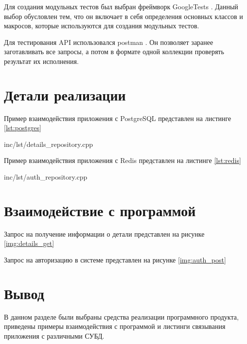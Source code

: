 Для создания модульных тестов был выбран фреймворк GoogleTests \cite{gtest}. Данный выбор обусловлен тем, что он включает в себя определения основных классов и макросов, которые используются для создания модульных тестов.

Для тестирования API использовался postman \cite{postman}. Он позволяет заранее заготавливать все запросы, а потом в формате одной коллекции проверять результат их исполнения.

\section{Детали реализации}

Пример взаимодействия приложения с PostgreSQL представлен на листинге \ref{lst:postgres}

\begin{lstinputlisting}[label=lst:postgres,caption=Взаимодействие приложения с PostgreSQL, language=lisp]{inc/lst/details_repository.cpp}
\end{lstinputlisting}

Пример взаимодействия приложения с Redis представлен на листинге \ref{lst:redis}

\begin{lstinputlisting}[label=lst:redis,caption=Взаимодействие приложения с Redis, language=lisp]{inc/lst/auth_repository.cpp}
\end{lstinputlisting}


\section{Взаимодействие с программой}
Запрос на получение информации о детали представлен на рисунке \ref{img:details_get}


Запрос на авторизацию в системе представлен на рисунке \ref{img:auth_post}

\section{Вывод}
В данном разделе были выбраны средства реализации программного продукта, приведены примеры взаимодействия с программой и листинги связывания приложения с различными СУБД.